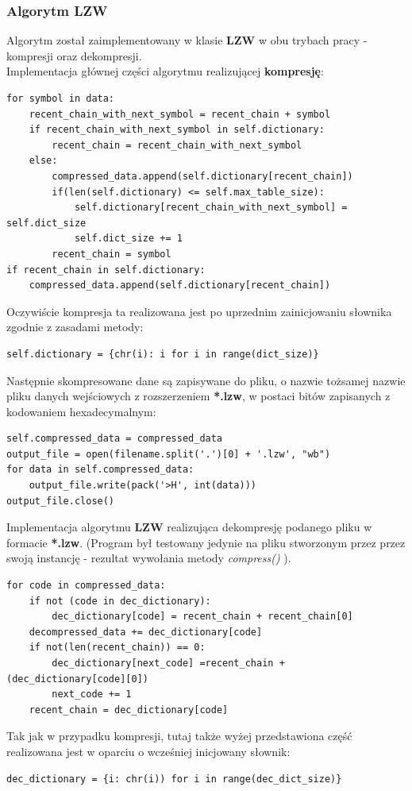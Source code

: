 \documentclass[12pt, a4paper]{article}
\begin{document}
\subsubsection{Algorytm LZW}
Algorytm został zaimplementowany w klasie \textbf{LZW} w obu trybach pracy - kompresji oraz dekompresji.\\
Implementacja głównej części algorytmu realizującej \textbf{kompresję}:
\begin{verbatim}
for symbol in data:
    recent_chain_with_next_symbol = recent_chain + symbol
    if recent_chain_with_next_symbol in self.dictionary:
        recent_chain = recent_chain_with_next_symbol
    else:
        compressed_data.append(self.dictionary[recent_chain])
        if(len(self.dictionary) <= self.max_table_size):
            self.dictionary[recent_chain_with_next_symbol] = self.dict_size
            self.dict_size += 1
        recent_chain = symbol
if recent_chain in self.dictionary:
    compressed_data.append(self.dictionary[recent_chain])
\end{verbatim}
Oczywiście kompresja ta realizowana jest po uprzednim zainicjowaniu słownika zgodnie z zasadami metody:
\begin{verbatim}
self.dictionary = {chr(i): i for i in range(dict_size)}
\end{verbatim}

Następnie skompresowane dane są zapisywane do pliku, o nazwie tożsamej nazwie pliku danych wejściowych z rozszerzeniem \textbf{*.lzw}, w postaci bitów zapisanych z kodowaniem hexadecymalnym:
\begin{verbatim}
self.compressed_data = compressed_data
output_file = open(filename.split('.')[0] + '.lzw', "wb")
for data in self.compressed_data:
    output_file.write(pack('>H', int(data)))
output_file.close()
\end{verbatim}

\vspace{1cm}
Implementacja algorytmu \textbf{LZW} realizująca dekompresję podanego pliku w formacie \textbf{*.lzw}. (Program był testowany jedynie na pliku stworzonym przez przez swoją instancję - rezultat wywołania metody \textit{compress()} ).
\begin{verbatim}
for code in compressed_data:
    if not (code in dec_dictionary):
        dec_dictionary[code] = recent_chain + recent_chain[0]
    decompressed_data += dec_dictionary[code]
    if not(len(recent_chain)) == 0:
        dec_dictionary[next_code] =recent_chain + (dec_dictionary[code][0])
        next_code += 1
    recent_chain = dec_dictionary[code]
\end{verbatim}
Tak jak w przypadku kompresji, tutaj także wyżej przedstawiona część realizowana jest w oparciu o wcześniej inicjowany słownik:
\begin{verbatim}
dec_dictionary = {i: chr(i)) for i in range(dec_dict_size)}
\end{verbatim}
\end{document}
